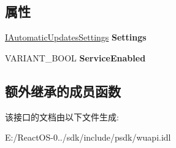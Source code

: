 \subsection*{属性}
\begin{DoxyCompactItemize}
\item 
\mbox{\label{interface_w_u_api_lib_1_1_i_automatic_updates_a2cc55b43dec6b98fb8f3e4f51859b92a}} 
\hyperlink{interface_w_u_api_lib_1_1_i_automatic_updates_settings}{I\+Automatic\+Updates\+Settings} {\bfseries Settings}
\item 
\mbox{\label{interface_w_u_api_lib_1_1_i_automatic_updates_ac1decdf15f8ee79352c5292d65fd7467}} 
V\+A\+R\+I\+A\+N\+T\+\_\+\+B\+O\+OL {\bfseries Service\+Enabled}
\end{DoxyCompactItemize}
\subsection*{额外继承的成员函数}


该接口的文档由以下文件生成\+:\begin{DoxyCompactItemize}
\item 
E\+:/\+React\+O\+S-\/0../sdk/include/psdk/wuapi.\+idl\end{DoxyCompactItemize}
